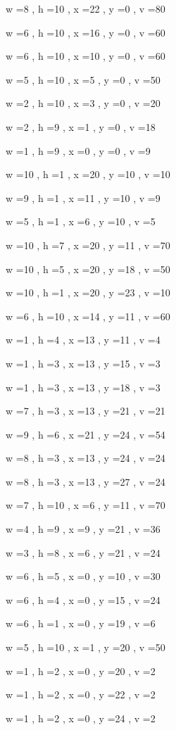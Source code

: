\documentclass[11pt]{article}
\begin{document}
w =8 , h =10 , x =22 , y =0 , v =80
\par
w =6 , h =10 , x =16 , y =0 , v =60
\par
w =6 , h =10 , x =10 , y =0 , v =60
\par
w =5 , h =10 , x =5 , y =0 , v =50
\par
w =2 , h =10 , x =3 , y =0 , v =20
\par
w =2 , h =9 , x =1 , y =0 , v =18
\par
w =1 , h =9 , x =0 , y =0 , v =9
\par
w =10 , h =1 , x =20 , y =10 , v =10
\par
w =9 , h =1 , x =11 , y =10 , v =9
\par
w =5 , h =1 , x =6 , y =10 , v =5
\par
w =10 , h =7 , x =20 , y =11 , v =70
\par
w =10 , h =5 , x =20 , y =18 , v =50
\par
w =10 , h =1 , x =20 , y =23 , v =10
\par
w =6 , h =10 , x =14 , y =11 , v =60
\par
w =1 , h =4 , x =13 , y =11 , v =4
\par
w =1 , h =3 , x =13 , y =15 , v =3
\par
w =1 , h =3 , x =13 , y =18 , v =3
\par
w =7 , h =3 , x =13 , y =21 , v =21
\par
w =9 , h =6 , x =21 , y =24 , v =54
\par
w =8 , h =3 , x =13 , y =24 , v =24
\par
w =8 , h =3 , x =13 , y =27 , v =24
\par
w =7 , h =10 , x =6 , y =11 , v =70
\par
w =4 , h =9 , x =9 , y =21 , v =36
\par
w =3 , h =8 , x =6 , y =21 , v =24
\par
w =6 , h =5 , x =0 , y =10 , v =30
\par
w =6 , h =4 , x =0 , y =15 , v =24
\par
w =6 , h =1 , x =0 , y =19 , v =6
\par
w =5 , h =10 , x =1 , y =20 , v =50
\par
w =1 , h =2 , x =0 , y =20 , v =2
\par
w =1 , h =2 , x =0 , y =22 , v =2
\par
w =1 , h =2 , x =0 , y =24 , v =2
\par
\newpage
\end{document}
